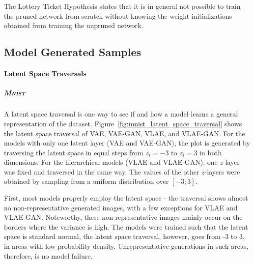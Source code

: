 The Lottery Ticket Hypothesis states that it is in general not possible to train the pruned network from scratch without knowing the weight initializations obtained from training the unpruned network.

\subsection{Model Generated Samples}\label{subsec:model-generated-samples}

\paragraph{Latent Space Traversals}

\subparagraph{\textsc{Mnist}}

A latent space traversal is one way to see if and how a model learns a general representation of the dataset.
Figure~\ref{fig:mnist_latent_space_traversal} shows the latent space traversal of \ac{VAE}, \ac{VAE}-\ac{GAN}, \ac{VLAE}, and \ac{VLAE}-\ac{GAN}.
For the models with only one latent layer (\ac{VAE} and \ac{VAE}-\ac{GAN}), the plot is generated by traversing the latent space in equal steps from $z_i = -3$ to $z_i = 3$ in both dimensions.
For the hierarchical models (\ac{VLAE} and \ac{VLAE}-\ac{GAN}), one $z$-layer was fixed and traversed in the same way.
The values of the other $z$-layers were obtained by sampling from a uniform distribution over $[-3; 3]$.

First, most models properly employ the latent space - the traversal shows almost no non-representative generated images, with a few exceptions for \ac{VLAE} and \ac{VLAE}-\ac{GAN}.
Noteworthy, these non-representative images mainly occur on the borders where the variance is high.
The models were trained such that the latent space is standard normal, the latent space traversal, however, goes from -3 to 3, in areas with low probability density.
Unrepresentative generations in such areas, therefore, is no model failure.

